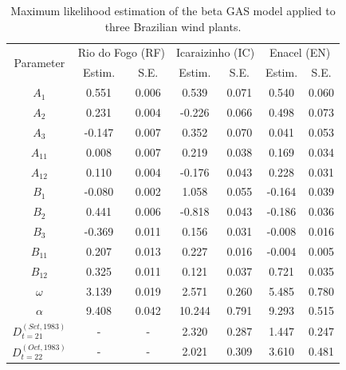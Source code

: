 \documentclass[a4paper]{IEEEtran}
\begin{document}
\begin{table}[htbp]
\centering
\caption{Maximum likelihood estimation of the beta GAS model applied to three Brazilian wind plants.}
\begin{tabular}{ccccccc}
\multirow{2}{*}{Parameter} & \multicolumn{2}{c}{Rio do Fogo (RF)} & \multicolumn{2}{c}{Icaraizinho (IC)} & \multicolumn{2}{c}{Enacel (EN)} \\
                           & Estim.     & S.E.      & Estim.     & S.E.      & Estim.     & S.E.      \\ \hline
$A_{1}$                    & 0.551      & 0.006     & 0.539     & 0.071      & 0.540      & 0.060     \\
$A_{2}$                    & 0.231      & 0.004     & -0.226      & 0.066     & 0.498     & 0.073     \\
$A_{3}$                    & -0.147     & 0.007     & 0.352      & 0.070     & 0.041      & 0.053     \\
$A_{11}$                   & 0.008      & 0.007     & 0.219      & 0.038     & 0.169      & 0.034     \\
$A_{12}$                   & 0.110       & 0.004     & -0.176      & 0.043     & 0.228     & 0.031     \\
$B_{1}$                    & -0.080      & 0.002     & 1.058      & 0.055     & -0.164      & 0.039     \\
$B_{2}$                    & 0.441      & 0.006     & -0.818     & 0.043     & -0.186     & 0.036     \\
$B_{3}$                    & -0.369     & 0.011     & 0.156    & 0.031     & -0.008       & 0.016     \\
$B_{11}$                   & 0.207      & 0.013     & 0.227      & 0.016     & -0.004       & 0.005      \\
$B_{12}$                   & 0.325      & 0.011     & 0.121      & 0.037     & 0.721      & 0.035     \\
$\omega$                   & 3.139      & 0.019     & 2.571     & 0.260     & 5.485      & 0.780     \\
$\alpha$                   & 9.408      & 0.042     & 10.244     & 0.791     & 9.293      & 0.515     \\
$D_{t=21}^{(Set, 1983)}$   & -          & -         & 2.320      & 0.287     & 1.447          & 0.247         \\
$D_{t=22}^{(Oct, 1983)}$   & -          & -         & 2.021      & 0.309     & 3.610      & 0.481     \\

\end{tabular}
\end{table}
\end{document}
